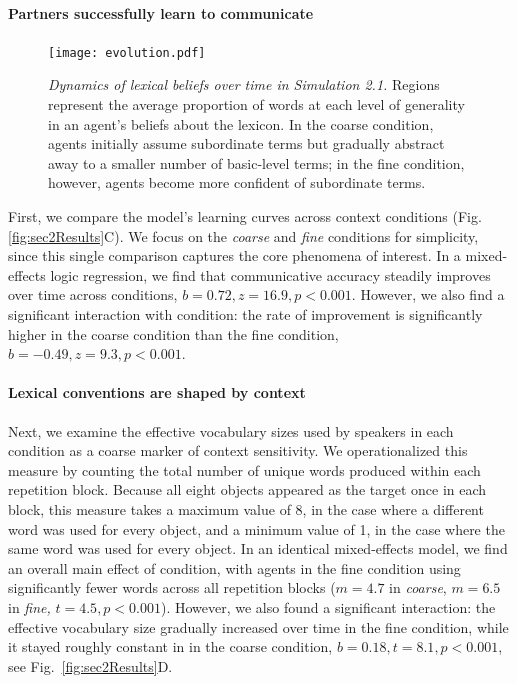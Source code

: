 \paragraph{Partners successfully learn to communicate}

\begin{figure}[t]
\begin{center}
\texttt{[image: evolution.pdf]}
\caption{\emph{Dynamics of lexical beliefs over time in Simulation 2.1.} Regions represent the average proportion of words at each level of generality in an agent's beliefs about the lexicon. In the coarse condition, agents initially assume subordinate terms but gradually abstract away to a smaller number of basic-level terms; in the fine condition, however, agents become more confident of subordinate terms.}
\label{fig:evolution}
\end{center}
\end{figure}

First, we compare the model's learning curves across context conditions (Fig. \ref{fig:sec2Results}C). 
We focus on the \emph{coarse} and \emph{fine} conditions for simplicity, since this single comparison captures the core phenomena of interest.
In a mixed-effects logic regression, we find that communicative accuracy steadily improves over time across conditions, $b=0.72, z = 16.9, p<0.001$.
However, we also find a significant interaction with condition: the rate of improvement is significantly higher in the coarse condition than the fine condition, $b=-0.49, z=9.3, p <0.001$. 

\paragraph{Lexical conventions are shaped by context}

Next, we examine the effective vocabulary sizes used by speakers in each condition as a coarse marker of context sensitivity. 
We operationalized this measure by counting the total number of unique words produced within each repetition block.
Because all eight objects appeared as the target once in each block, this measure takes a maximum value of 8, in the case where a different word was used for every object, and a minimum value of 1, in the case where the same word was used for every object.
In an identical mixed-effects model, we find an overall main effect of condition, with agents in the fine condition using significantly fewer words across all repetition blocks ($m = 4.7$ in \emph{coarse}, $m=6.5$ in \emph{fine,} $t = 4.5, p < 0.001$).
However, we also found a significant interaction: the effective vocabulary size gradually increased over time in the fine condition, while it stayed roughly constant in in the coarse condition, $b = 0.18, t = 8.1, p < 0.001$, see Fig.~\ref{fig:sec2Results}D.


